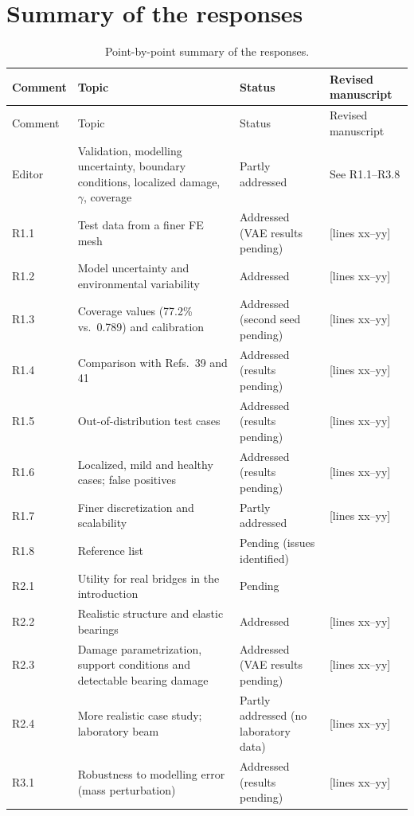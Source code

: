 \documentclass[11pt]{article}
\newcommand{\tbd}[1]{\textcolor{note}{\textsf{[#1]}}}
\newcommand{\lines}[1]{\tbd{lines #1}}
\begin{document}
\section{Summary of the responses}
{\small
\begin{longtable}{p{1.55cm}p{6.0cm}p{3.0cm}p{3.6cm}}
\caption{Point-by-point summary of the responses.}\label{tab:summary}\\
\toprule
Comment & Topic & Status & Revised manuscript \\
\midrule
\endfirsthead
\toprule
Comment & Topic & Status & Revised manuscript \\
\midrule
\endhead
Editor & Validation, modelling uncertainty, boundary conditions, localized damage, $\gamma$, coverage & Partly addressed & See R1.1--R3.8 \\
R1.1 & Test data from a finer FE mesh & Addressed (VAE results pending) & \lines{xx--yy} \\
R1.2 & Model uncertainty and environmental variability & Addressed & \lines{xx--yy} \\
R1.3 & Coverage values (77.2\% vs.\ 0.789) and calibration & Addressed (second seed pending) & \lines{xx--yy} \\
R1.4 & Comparison with Refs.\ 39 and 41 & Addressed (results pending) & \lines{xx--yy} \\
R1.5 & Out-of-distribution test cases & Addressed (results pending) & \lines{xx--yy} \\
R1.6 & Localized, mild and healthy cases; false positives & Addressed (results pending) & \lines{xx--yy} \\
R1.7 & Finer discretization and scalability & Partly addressed & \lines{xx--yy} \\
R1.8 & Reference list & Pending (issues identified) & \\
R2.1 & Utility for real bridges in the introduction & Pending & \\
R2.2 & Realistic structure and elastic bearings & Addressed & \lines{xx--yy} \\
R2.3 & Damage parametrization, support conditions and detectable bearing damage & Addressed (VAE results pending) & \lines{xx--yy} \\
R2.4 & More realistic case study; laboratory beam & Partly addressed (no laboratory data) & \lines{xx--yy} \\
R3.1 & Robustness to modelling error (mass perturbation) & Addressed (results pending) & \lines{xx--yy} \\

\end{longtable}}
\end{document}
